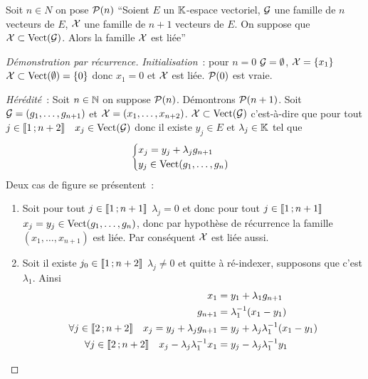 \begin{lemme}
  Soit \(n \in N\) on pose \(\P(n)\) ``Soient \(E\) un \(\K\)-espace vectoriel,
  \(\G\) une famille de \(n\) vecteurs de \(E\), \(\X\) une famille de \(n+1\)
  vecteurs de \(E\). On suppose que \(\X \subset \VectEngendre(\G)\). Alors la
  famille \(\X\) est liée''
\end{lemme}
\begin{proof}[Démonstration par récurrence]
  \emph{Initialisation}~: pour \(n=0\) \(\G=\emptyset\), \(\X=\{x_1\}\) \(\X
  \subset \VectEngendre(\emptyset)=\{0\}\) donc \(x_1=0\) et \(\X\) est liée.
  \(\P(0)\) est vraie.

  \emph{Hérédité}~: Soit \(n \in \N\) on suppose \(\P(n)\). Démontrons
  \(\P(n+1)\). Soit \(\G=(g_1, \ldots, g_{n+1})\) et \(\X=(x_1, \ldots,
  x_{n+2})\). \(\X \subset \VectEngendre(\G)\) c'est-à-dire que pour tout \(j
  \in \intervalleentier{1}{n+2} \quad x_j \in \VectEngendre(\G)\) donc il existe
  \(y_j \in E\) et \(\lambda_j \in \K\) tel que
  \begin{equation}
    \begin{cases} x_j = y_j + \lambda_j g_{n+1} \\ y_j \in \VectEngendre(g_1,
    \ldots, g_n) \end{cases}
  \end{equation}
  Deux cas de figure se présentent~:
  \begin{enumerate}
    \item Soit pour tout \(j \in \intervalleentier{1}{n+1}\) \(\lambda_j=0\) et
      donc pour tout \(j \in \intervalleentier{1}{n+1}\) \(x_j=y_j \in
      \VectEngendre(g_1, \ldots, g_n)\), donc par hypothèse de récurrence la
      famille \((x_1, \ldots, x_{n+1})\) est liée. Par conséquent \(\X\) est
      liée aussi.
    \item Soit il existe \(j_0 \in \intervalleentier{1}{n+2}\) \(\lambda_j \neq
      0\) et quitte à ré-indexer, supposons que c'est \(\lambda_1\). Ainsi
      \begin{align}
        x_1 &= y_1 + \lambda_1 g_{n+1} \\
        g_{n+1} &= \lambda_1^{-1}(x_1-y_1) \\
        \forall j \in \intervalleentier{2}{n+2} \quad x_j = y_j + \lambda_j
        g_{n+1} &= y_j + \lambda_j \lambda_1^{-1}(x_1-y_1)\\
        \forall j \in \intervalleentier{2}{n+2} \quad x_j -
        \lambda_j\lambda_1^{-1}x_1 &= y_j - \lambda_j \lambda_1^{-1} y_1
      \end{align}

\end{enumerate}
\end{proof}
